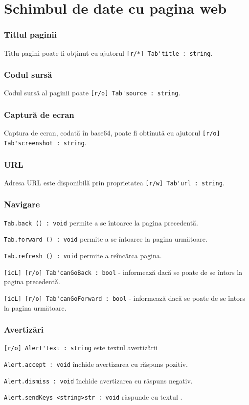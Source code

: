 \section{Schimbul de date cu pagina web}
\label{dataexchange}

\subsubsection{Titlul paginii}

Titlu pagini poate fi obținut cu ajutorul \lstinline|[r/*] Tab'title : string|.

\subsubsection{Codul sursă}

Codul sursă al paginii poate \lstinline|[r/o] Tab'source : string|.

\subsubsection{Captură de ecran}

Captura de ecran, codată în base64, poate fi obținută cu ajutorul \lstinline|[r/o] Tab'screenshot : string|.

\subsubsection{URL}

Adresa URL este disponibilă prin proprietatea \lstinline|[r/w] Tab'url : string|.

\subsubsection{Navigare}

\lstinline|Tab.back () : void| permite a se întoarce la pagina precedentă.

\lstinline|Tab.forward () : void| permite a se întoarce la pagina următoare.

\lstinline|Tab.refresh () : void|  permite a reîncărca pagina.

\lstinline|[icL] [r/o] Tab'canGoBack : bool| - informează dacă se poate de se întors la pagina precedentă.

\lstinline|[icL] [r/o] Tab'canGoForward : bool| - informează dacă se poate de se întors la pagina următoare.


\subsubsection{Avertizări}

\lstinline|[r/o] Alert'text : string| este textul avertizării

\lstinline|Alert.accept : void| închide avertizarea cu răspuns pozitiv.

\lstinline|Alert.dismiss : void| închide avertizarea cu răspuns negativ.

\lstinline|Alert.sendKeys <string>str : void| răspunde cu textul .

